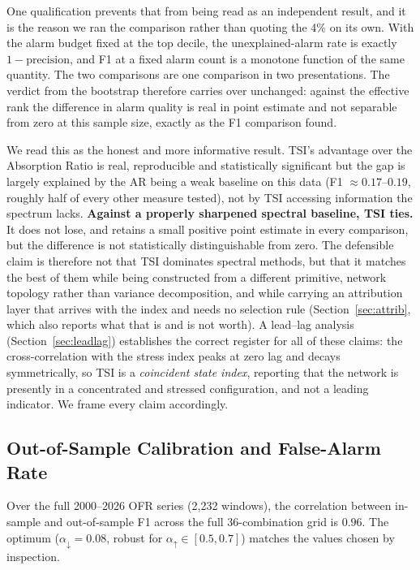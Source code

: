 \documentclass[11pt,a4paper]{article}
\begin{document}
One qualification prevents that from being read as an independent result, and
it is the reason we ran the comparison rather than quoting the 4\% on its own.
With the alarm budget fixed at the top decile, the unexplained-alarm rate is
exactly $1 - \text{precision}$, and F1 at a fixed alarm count is a monotone
function of the same quantity. The two comparisons are one comparison in two
presentations. The verdict from the bootstrap therefore carries over unchanged:
against the effective rank the difference in alarm quality is real in point
estimate and not separable from zero at this sample size, exactly as the F1
comparison found.

We read this as the honest and more informative result. TSI's advantage
over the Absorption Ratio is real, reproducible and statistically significant
but the gap is largely explained by the AR being a weak baseline on this
data (F1 $\approx 0.17$--$0.19$, roughly half of every other measure tested),
not by TSI accessing information the spectrum lacks. \textbf{Against a
properly sharpened spectral baseline, TSI ties.} It does not lose, and
retains a small positive point estimate in every comparison, but the difference
is not statistically distinguishable from zero. The defensible claim is
therefore not that TSI dominates spectral methods, but that it matches the
best of them while being constructed from a different primitive, network
topology rather than variance decomposition, and while carrying an attribution
layer that arrives with the index and needs no selection rule
(Section~\ref{sec:attrib}, which also reports what that is and is not worth). A lead--lag
analysis (Section~\ref{sec:leadlag}) establishes the correct register for all
of these claims: the cross-correlation with the stress index peaks at zero lag
and decays symmetrically, so TSI is a \emph{coincident state index},
reporting that the network is presently in a concentrated and stressed
configuration, and not a leading indicator. We frame every claim accordingly.


\subsection{Out-of-Sample Calibration and False-Alarm Rate}
\label{sec:oos_results}

Over the full 2000--2026 OFR series (2,232 windows), the correlation between
in-sample and out-of-sample F1 across the full 36-combination grid is
$\mathbf{0.96}$. The optimum ($\alpha_{\downarrow} = 0.08$, robust for
$\alpha_{\uparrow} \in [0.5, 0.7]$) matches the values chosen by inspection.
\end{document}
